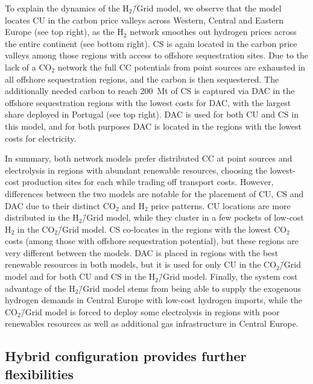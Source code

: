 \documentclass[twocolumn]{article}
\newcommand{\COtwo}{CO$_2$}
\newcommand{\Htwo}{H$_2$}
\newcommand{\modCO}{CO$_2$\=/Grid model}
\newcommand{\modH}{H$_2$\=/Grid model}
\begin{document}
To explain the dynamics of the \modH{}, we observe that the model locates CU in the carbon price valleys across Western, Central and Eastern Europe (see top right), as the \Htwo{} network smoothes out hydrogen prices across the entire continent (see bottom right). CS is again located in the carbon price valleys among those regions with access to offshore sequestration sites. Due to the lack of a \COtwo{} network the full CC potentials from point sources are exhausted in all offshore sequestration regions, and the carbon is then sequestered. The additionally needed carbon to reach 200~Mt of CS is captured via DAC in the offshore sequestration regions with the lowest costs for DAC, with the largest share deployed in Portugal (see top right). DAC is used for both CU and CS in this model, and for both purposes DAC is located in the regions with the lowest costs for electricity.

In summary, both network models prefer distributed CC at point sources and electrolysis in regions with abundant renewable resources, choosing the lowest-cost production sites for each while trading off transport costs. However, differences between the two models are notable for the placement of CU, CS and DAC due to their distinct \COtwo{} and \Htwo{} price patterns. CU locations are more distributed in the \modH{}, while they cluster in a few pockets of low-cost \Htwo{} in the \modCO{}. CS co-locates in the regions with the lowest \COtwo{} costs (among those with offshore sequestration potential), but these regions are very different between the models. DAC is placed in regions with the best renewable resources in both models, but it is used for only CU in the \modCO{} and for both CU and CS in the \modH{}. Finally, the system cost advantage of the \modH{} stems from being able to supply the exogenous hydrogen demands in Central Europe with low-cost hydrogen imports, while the \modCO{} is forced to deploy some electrolysis in regions with poor renewables resources as well as additional gas infrastructure in Central Europe.


\subsection*{Hybrid configuration provides further flexibilities}\label{subsec:Hybrid}
\end{document}
